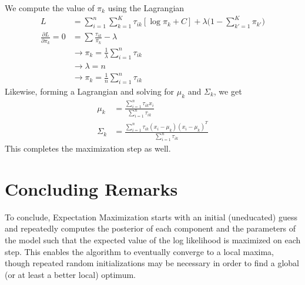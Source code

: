 \documentclass{article}
\begin{document}
We compute the value of $\pi_{k}$ using the Lagrangian
\begin{align*}
	L
		&= \sum\limits_{i = 1}^{n} \sum\limits_{k = 1}^{K} \tau_{ik} [\log \pi_{k} + C] + \lambda \Bigg(1 - \sum\limits_{k' = 1}^{K} \pi_{k'}\Bigg) \\
	\frac{\partial L}{\partial \pi_{k}} = 0
		&=  \sum\limits \frac{\tau_{ik}}{\pi_{k}} - \lambda \\
		&\rightarrow \pi_{k} = \frac{1}{\lambda} \sum\limits_{i = 1}^{n} \tau_{ik} \\
		&\rightarrow \lambda = n \\
		&\rightarrow \pi_{k} = \frac{1}{n} \sum\limits_{i = 1}^{n} \tau_{ik}
\end{align*}
Likewise, forming a Lagrangian and solving for $\mu_{k}$ and $\Sigma_{k}$, we get
\begin{align*}
	\mu_{k} &= \frac{\sum\limits_{i = 1}^{n} \tau_{ik}x_{i}}{\sum\limits_{i = 1}^{n} \tau_{ik}} \\
	\Sigma_{k} &= \frac{\sum\limits_{i = 1}^{n} \tau_{ik}(x_{i} - \mu_{k})(x_{i} - \mu_{k})^{T}}{\sum\limits_{i = 1}^{n} \tau_{ik}}
\end{align*}
This completes the maximization step as well.

\section{Concluding Remarks}
To conclude, Expectation Maximization starts with an initial (uneducated) guess and repeatedly computes the posterior of each component and the parameters of the model such that the expected value of the log likelihood is maximized on each step. This enables the algorithm to eventually converge to a local maxima, though repeated random initializations may be necessary in order to find a global (or at least a better local) optimum.
\end{document}
